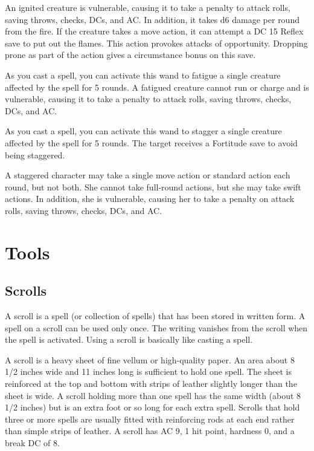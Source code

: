An ignited creature is vulnerable, causing it to take a  penalty to attack rolls, saving throws, checks, DCs, and AC. In addition, it takes d6 damage per round from the fire. If the creature takes a move action, it can attempt a DC 15 Reflex save to put out the flames. This action provokes attacks of opportunity. Dropping prone as part of the action gives a  circumstance bonus on this save.


 As you cast a spell, you can activate this wand to fatigue a single creature affected by the spell for 5 rounds. A fatigued creature cannot run or charge and is vulnerable, causing it to take a  penalty to attack rolls, saving throws, checks, DCs, and AC.


 As you cast a spell, you can activate this wand to stagger a single creature affected by the spell for 5 rounds. The target receives a Fortitude save to avoid being staggered.

A staggered character may take a single move action or standard action each round, but not both. She cannot take full-round actions, but she may take swift actions. In addition, she is vulnerable, causing her to take a  penalty on attack rolls, saving throws, checks, DCs, and AC.


\section{Tools}

\subsection{Scrolls}
A scroll is a spell (or collection of spells) that has been stored in written form. A spell on a scroll can be used only once. The writing vanishes from the scroll when the spell is activated. Using a scroll is basically like casting a spell.

 A scroll is a heavy sheet of fine vellum or high-quality paper. An area about 8 1/2 inches wide and 11 inches long is sufficient to hold one spell. The sheet is reinforced at the top and bottom with strips of leather slightly longer than the sheet is wide. A scroll holding more than one spell has the same width (about 8 1/2 inches) but is an extra foot or so long for each extra spell. Scrolls that hold three or more spells are usually fitted with reinforcing rods at each end rather than simple strips of leather. A scroll has AC 9, 1 hit point, hardness 0, and a break DC of 8.

